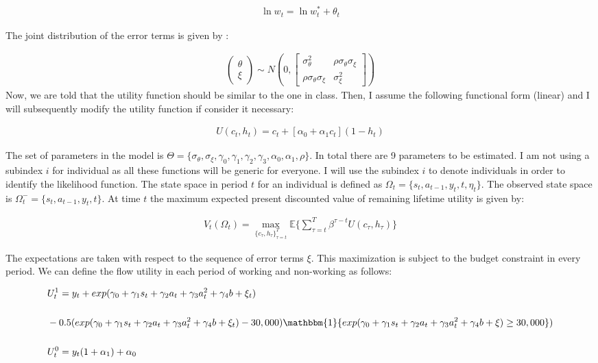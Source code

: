 \documentclass[11pt]{article}
\begin{document}
\begin{align}
	\ln w_t=\ln w^*_t +\theta_t
\end{align}

The joint distribution of the error terms is given by :

\begin{align}
	\begin{pmatrix}
	\theta \\
	\xi
	\end{pmatrix}
	 \sim N\left(0,\begin{bmatrix}    
	 \sigma_\theta^2 & \rho\sigma_\theta\sigma_{\xi} \\
	  \rho\sigma_\theta\sigma_{\xi}  & \sigma_{\xi}^2
	 \end{bmatrix}
	 \right)
 \end{align} Now, we are told that the utility function should be similar to the one in class. Then, I assume the following functional form (linear) and I will subsequently modify the utility function if consider it necessary:

\begin{align}
	U(c_t,h_t)=c_t+\left[ \alpha_0+\alpha_1c_t\right](1-h_t)
\end{align}

The set of parameters in the model is $\Theta=\{\sigma_\theta, \sigma_\xi, \gamma_0,\gamma_1,\gamma_2,\gamma_3,\alpha_0,\alpha_1,\rho\}$. In total there are 9 parameters to be estimated. I am not using a subindex $i$ for individual as all these functions will be generic for everyone. I will use the subindex $i$ to denote individuals in order to identify the likelihood function. The state space in period $t$ for an individual is defined as $\Omega_t=\{s_t,a_{t-1},y_t,t,\eta_t  \}$. The observed state space is $\Omega_t^-= \{  s_t,a_{t-1},y_t ,t\}$. At time $t$ the maximum expected present discounted value of remaining lifetime utility is given by:

\begin{align}\label{eq:v1}
	V_t(\Omega_t)=\max_{ \{c_\tau,h_\tau\}_{\tau=t}^T } \mathbb{E}\{ \sum_{\tau=t}^T \beta^{\tau-t}U(c_\tau,h_\tau) \}
\end{align}

The expectations are taken with respect to the sequence of error terms $\xi$. This maximization is subject to the budget constraint in every period. We can define the flow utility in each period of working and non-working as follows:
\begin{footnotesize}
\begin{align}\label{eq:us}
	& U_t^1  =y_t+exp(\gamma_0+\gamma_1s_{t}+\gamma_2a_{t}+\gamma_3a_{t}^2+\gamma_4b+\xi_t) \nonumber \\[0.2in]
	& - 0.5(exp(\gamma_0+\gamma_1s_{t}+\gamma_2a_{t}+\gamma_3a_{t}^2+\gamma_4b+\xi_t)-30,000)\mathbbm{1}\{exp(\gamma_0+\gamma_1s_{t}+\gamma_2a_{t}+\gamma_3a_{t}^2+\gamma_4b+\xi)\geq 30,000 \})\nonumber \\[0.2in]
	& U_t^0  =y_t(1+\alpha_1)+\alpha_0
\end{align}
\end{footnotesize}
\end{document}
